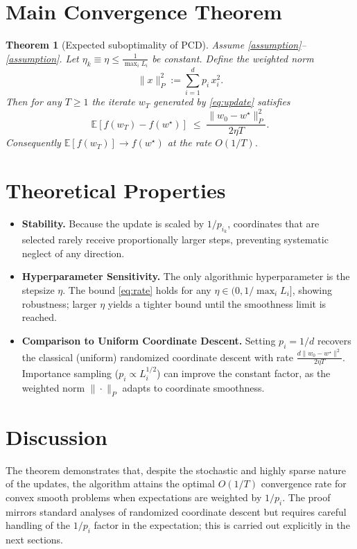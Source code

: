 \documentclass[11pt]{article}
\newtheorem{theorem}{Theorem}
\begin{document}
\section*{Main Convergence Theorem}
\begin{theorem}[Expected suboptimality of PCD]\label{thm:main}
Assume \ref{assumption}–\ref{assumption}. Let $\eta_k\equiv\eta\le \frac{1}{\max_i L_i}$ be constant. Define the weighted norm
\[
\|x\|_{P}^{2}:=\sum_{i=1}^{d}p_i\,x_i^{2}.
\]
Then for any $T\ge1$ the iterate $w_T$ generated by \eqref{eq:update} satisfies
\begin{equation}
\mathbb{E}\!\left[f(w_T)-f(w^{\star})\right]
\;\le\;
\frac{\|w_0-w^{\star}\|_{P}^{2}}{2\eta T}.
\label{eq:rate}
\end{equation}
Consequently $\mathbb{E}[f(w_T)]\to f(w^{\star})$ at the rate $O(1/T)$.
\end{theorem}

\section*{Theoretical Properties}
\begin{itemize}[leftmargin=*]
\item \textbf{Stability.} Because the update is scaled by $1/p_{i_k}$, coordinates that are selected rarely receive proportionally larger steps, preventing systematic neglect of any direction.
\item \textbf{Hyperparameter Sensitivity.} The only algorithmic hyperparameter is the stepsize $\eta$. The bound \eqref{eq:rate} holds for any $\eta\in(0,1/\max_i L_i]$, showing robustness; larger $\eta$ yields a tighter bound until the smoothness limit is reached.
\item \textbf{Comparison to Uniform Coordinate Descent.} Setting $p_i=1/d$ recovers the classical (uniform) randomized coordinate descent with rate $\frac{d\|w_0-w^{\star}\|^{2}}{2\eta T}$. Importance sampling ($p_i\propto L_i^{1/2}$) can improve the constant factor, as the weighted norm $\|\cdot\|_P$ adapts to coordinate smoothness.
\end{itemize}

\section*{Discussion}
The theorem demonstrates that, despite the stochastic and highly sparse nature of the updates, the algorithm attains the optimal $O(1/T)$ convergence rate for convex smooth problems when expectations are weighted by $1/p_i$. The proof mirrors standard analyses of randomized coordinate descent but requires careful handling of the $1/p_i$ factor in the expectation; this is carried out explicitly in the next sections.
\end{document}
